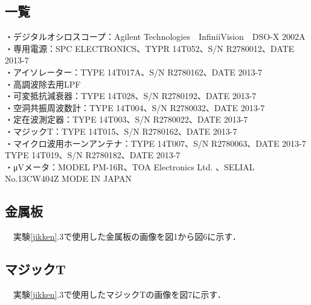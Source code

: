 \subsection{一覧}
・デジタルオシロスコープ：Agilent Technologies　InfiniiVision　DSO-X 2002A\\
・専用電源：SPC ELECTRONICS、TYPR 14T052、S/N R2780012、DATE 2013-7\\
・アイソレーター：TYPE 14T017A、S/N R2780162、DATE 2013-7\\
・高調波除去用LPF\\
・可変抵抗減衰器：TYPE 14T028、S/N R2780192、DATE 2013-7\\
・空洞共振周波数計：TYPE 14T004、S/N R2780032、DATE 2013-7\\
・定在波測定器：TYPE 14T003、S/N R2780022、DATE 2013-7\\
・マジックT：TYPE 14T015、S/N R2780162、DATE 2013-7\\
・マイクロ波用ホーンアンテナ：TYPE 14T007、S/N R2780063、DATE 2013-7 TYPE 14T019、S/N R2780182、DATE 2013-7\\
・μVメータ：MODEL PM-16R、TOA Electronics Ltd. 、SELIAL No.13CW404Z MODE IN JAPAN\\

\subsection{金属板}
　実験\ref{jikken}.3で使用した金属板の画像を図1から図6に示す．\\

\subsection{マジックT}
　実験\ref{jikken}.3で使用したマジックTの画像を図7に示す．

